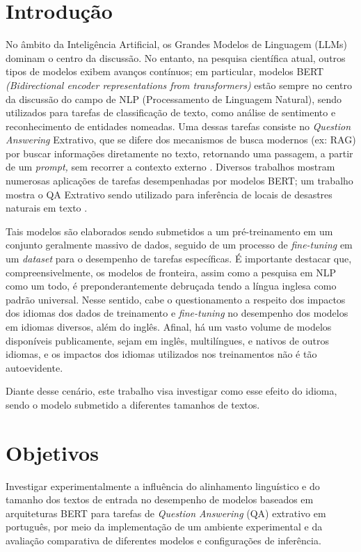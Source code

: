 \documentclass[12pt,a4paper]{article}
\begin{document}
\section{Introdução}
No âmbito da Inteligência Artificial, os Grandes Modelos de Linguagem (LLMs) dominam o centro da discussão. No entanto, na pesquisa científica atual, outros tipos de modelos exibem avanços contínuos; em particular, modelos BERT \textit{(Bidirectional encoder representations from transformers)} estão sempre no centro da discussão do campo de NLP (Processamento de Linguagem Natural), sendo utilizados para tarefas de classificação de texto, como análise de sentimento e reconhecimento de entidades nomeadas. Uma dessas tarefas consiste no \textit{Question Answering} Extrativo, que se difere dos mecanismos de busca modernos (ex: RAG) por buscar informações diretamente no texto, retornando uma passagem, a partir de um \textit{prompt,} sem recorrer a contexto externo \cite{le}. Diversos trabalhos mostram numerosas aplicações de tarefas desempenhadas por modelos BERT; um trabalho mostra o QA Extrativo sendo utilizado para inferência de locais de desastres naturais em texto \cite{sharma}.

Tais modelos são elaborados sendo submetidos a um pré-treinamento em um conjunto geralmente massivo de dados, seguido de um processo de \textit{fine-tuning} em um \textit{dataset} para o desempenho de tarefas específicas. É importante destacar que, compreensivelmente, os modelos de fronteira, assim como a pesquisa em NLP como um todo, é preponderantemente debruçada tendo a língua inglesa como padrão universal. Nesse sentido, cabe o questionamento a respeito dos impactos dos idiomas dos dados de treinamento e \textit{fine-tuning} no desempenho dos modelos em idiomas diversos, além do inglês. Afinal, há um vasto volume de modelos disponíveis publicamente, sejam em inglês, multilíngues, e nativos de outros idiomas, e os impactos dos idiomas utilizados nos treinamentos não é tão autoevidente.

Diante desse cenário, este trabalho visa investigar como esse efeito do idioma, sendo o modelo submetido a diferentes tamanhos de textos.

\section{Objetivos}

Investigar experimentalmente a influência do alinhamento linguístico e do tamanho dos textos de entrada no desempenho de modelos baseados em arquiteturas BERT para tarefas de \textit{Question Answering} (QA) extrativo em português, por meio da implementação de um ambiente experimental e da avaliação comparativa de diferentes modelos e configurações de inferência.
\end{document}
